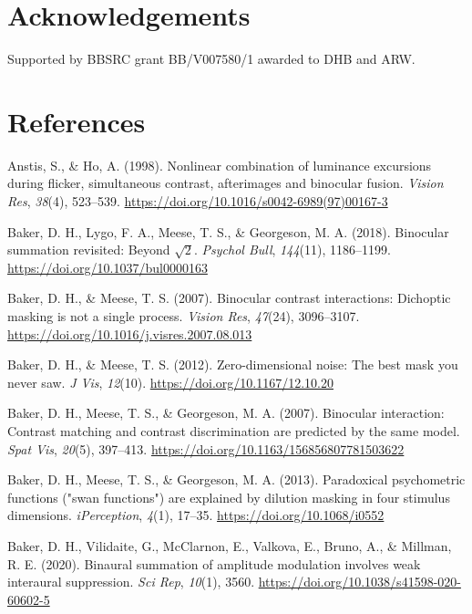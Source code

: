 \documentclass[
  letterpaper,
  DIV=11,
  numbers=noendperiod]{scrartcl}
\newlength{\cslhangindent}
\newenvironment{CSLReferences}[2] %
 {\begin{list}{}{%
  \setlength{\itemindent}{0pt}
  \setlength{\leftmargin}{0pt}
  \setlength{\parsep}{0pt}
  \ifodd #1
   \setlength{\leftmargin}{\cslhangindent}
   \setlength{\itemindent}{-1\cslhangindent}
  \fi
  \setlength{\itemsep}{#2\baselineskip}}}
 {\end{list}}
\begin{document}
\section{Acknowledgements}\label{acknowledgements}

Supported by BBSRC grant BB/V007580/1 awarded to DHB and ARW.

\section{References}\label{references}

\label{refs}
\begin{CSLReferences}{1}{0}
Anstis, S., \& Ho, A. (1998). Nonlinear combination of luminance
excursions during flicker, simultaneous contrast, afterimages and
binocular fusion. \emph{Vision Res}, \emph{38}(4), 523--539.
\url{https://doi.org/10.1016/s0042-6989(97)00167-3}

Baker, D. H., Lygo, F. A., Meese, T. S., \& Georgeson, M. A. (2018).
Binocular summation revisited: Beyond \(\sqrt{2}\). \emph{Psychol Bull},
\emph{144}(11), 1186--1199. \url{https://doi.org/10.1037/bul0000163}

Baker, D. H., \& Meese, T. S. (2007). Binocular contrast interactions:
Dichoptic masking is not a single process. \emph{Vision Res},
\emph{47}(24), 3096--3107.
\url{https://doi.org/10.1016/j.visres.2007.08.013}

Baker, D. H., \& Meese, T. S. (2012). Zero-dimensional noise: The best
mask you never saw. \emph{J Vis}, \emph{12}(10).
\url{https://doi.org/10.1167/12.10.20}

Baker, D. H., Meese, T. S., \& Georgeson, M. A. (2007). Binocular
interaction: Contrast matching and contrast discrimination are predicted
by the same model. \emph{Spat Vis}, \emph{20}(5), 397--413.
\url{https://doi.org/10.1163/156856807781503622}

Baker, D. H., Meese, T. S., \& Georgeson, M. A. (2013). Paradoxical
psychometric functions ("swan functions") are explained by dilution
masking in four stimulus dimensions. \emph{{iPerception}}, \emph{4}(1),
17--35. \url{https://doi.org/10.1068/i0552}

Baker, D. H., Vilidaite, G., McClarnon, E., Valkova, E., Bruno, A., \&
Millman, R. E. (2020). Binaural summation of amplitude modulation
involves weak interaural suppression. \emph{Sci Rep}, \emph{10}(1),
3560. \url{https://doi.org/10.1038/s41598-020-60602-5}


\end{CSLReferences}
\end{document}
